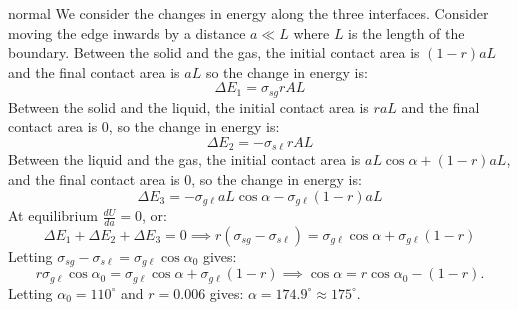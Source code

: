 \begin{solution}{normal}
We consider the changes in energy along the three interfaces. Consider moving the edge inwards by a distance $a \ll L$ where $L$ is the length of the boundary. Between the solid and the gas, the initial contact area is $(1-r)aL$ and the final contact area is $aL$ so the change in energy is:
$$\Delta E_1 = \sigma_{sg}rAL$$
Between the solid and the liquid, the initial contact area is $raL$ and the final contact area is $0$, so the change in energy is:
$$\Delta E_2 = -\sigma_{s\ell}rAL$$
Between the liquid and the gas, the initial contact area is $aL\cos\alpha+(1-r)aL$, and the final contact area is $0$, so the change in energy is:
$$\Delta E_3 = -\sigma_{g\ell}aL\cos\alpha-\sigma_{g\ell}(1-r)aL$$
At equilibrium $\frac{dU}{da}=0$, or: $$\Delta E_1+\Delta E_2 + \Delta E_3=0 \implies r\left(\sigma_{sg}-\sigma_{s\ell}\right)=\sigma_{g\ell}\cos\alpha+\sigma_{g\ell}(1-r)$$
Letting $\sigma_{sg}-\sigma_{s\ell}=\sigma_{g\ell}\cos\alpha_0$ gives:
$$r\sigma_{g\ell}\cos\alpha_0=\sigma_{g\ell}\cos\alpha+\sigma_{g\ell}(1-r)\implies \cos\alpha = r\cos\alpha_0 - (1-r).$$
Letting $\alpha_0=110^\circ$ and $r=0.006$ gives: $\boxed{\alpha=174.9^\circ \approx 175^\circ}$.
\end{solution}